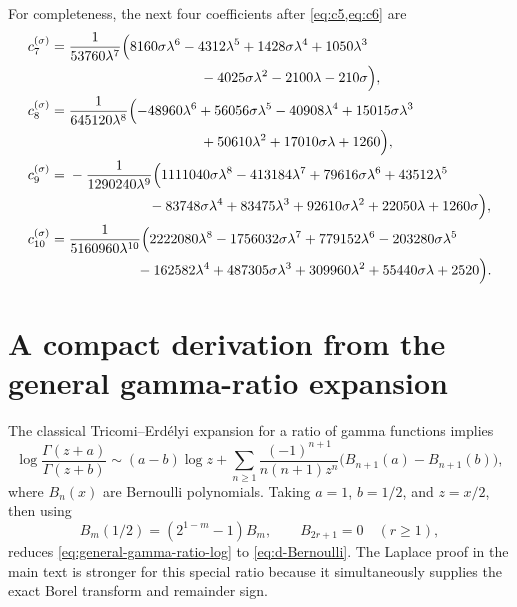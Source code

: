 \documentclass[11pt,a4paper]{article}
\numberwithin{equation}{section}
\theoremstyle{definition}
\theoremstyle{remark}
\begin{document}
For completeness, the next four coefficients after
\cref{eq:c5,eq:c6} are
\begin{align}
 c_7^{(\sigma)}={}&\frac1{53760\lambda^7}\Bigl(
 8160\sigma\lambda^6-4312\lambda^5+1428\sigma\lambda^4
 +1050\lambda^3\notag\\
 &\hspace{33mm}
 -4025\sigma\lambda^2-2100\lambda-210\sigma\Bigr),
 \label{eq:c7}\\
 c_8^{(\sigma)}={}&\frac1{645120\lambda^8}\Bigl(
 -48960\lambda^6+56056\sigma\lambda^5-40908\lambda^4
 +15015\sigma\lambda^3\notag\\
 &\hspace{33mm}
 +50610\lambda^2+17010\sigma\lambda+1260\Bigr),
 \label{eq:c8}\\
 c_9^{(\sigma)}={}&-\frac1{1290240\lambda^9}\Bigl(
 1111040\sigma\lambda^8-413184\lambda^7+79616\sigma\lambda^6
 +43512\lambda^5\notag\\
 &\hspace{20mm}
 -83748\sigma\lambda^4+83475\lambda^3+92610\sigma\lambda^2
 +22050\lambda+1260\sigma\Bigr),
 \label{eq:c9}\\
 c_{10}^{(\sigma)}={}&\frac1{5160960\lambda^{10}}\Bigl(
 2222080\lambda^8-1756032\sigma\lambda^7+779152\lambda^6
 -203280\sigma\lambda^5\notag\\
 &\hspace{17mm}
 -162582\lambda^4+487305\sigma\lambda^3+309960\lambda^2
 +55440\sigma\lambda+2520\Bigr).
 \label{eq:c10}
\end{align}

\section{A compact derivation from the general gamma-ratio expansion}

The classical Tricomi--Erd\'elyi expansion for a ratio of gamma functions
\cite{TricomiErdelyi,DLMFGamma} implies
\begin{equation}\label{eq:general-gamma-ratio-log}
 \log\frac{\Gamma(z+a)}{\Gamma(z+b)}
 \sim(a-b)\log z+
 \sum_{n\ge1}\frac{(-1)^{n+1}}
 {n(n+1)z^n}\bigl(B_{n+1}(a)-B_{n+1}(b)\bigr),
\end{equation}
where \(B_n(x)\) are Bernoulli polynomials.  Taking
\(a=1\), \(b=1/2\), and \(z=x/2\), then using
\[
 B_m(1/2)=(2^{1-m}-1)B_m,
 \qquad B_{2r+1}=0\quad(r\ge1),
\]
reduces \cref{eq:general-gamma-ratio-log} to
\cref{eq:d-Bernoulli}.  The Laplace proof in the main text is stronger for
this special ratio because it simultaneously supplies the exact Borel
transform and remainder sign.
\end{document}
